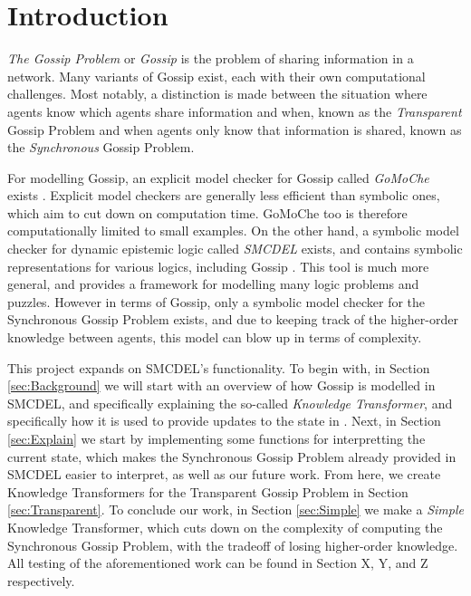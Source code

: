 \section{Introduction}

\textit{The Gossip Problem} or \textit{Gossip} is the problem of sharing information in a network. Many variants of Gossip exist, each with their own computational challenges. Most notably, a distinction is made between the situation where agents know which agents share information and when, known as the \textit{Transparent} Gossip Problem and when agents only know that information is shared, known as the \textit{Synchronous} Gossip Problem.

For modelling Gossip, an explicit model checker for Gossip called \textit{GoMoChe} exists \cite{gattinger2023gomoche}. Explicit model checkers are generally less efficient than symbolic ones, which aim to cut down on computation time. GoMoChe too is therefore computationally limited to small examples. On the other hand, a symbolic model checker for dynamic epistemic logic called \textit{SMCDEL} exists, and contains symbolic representations for various logics, including Gossip \cite{GattingerThesis2018}. This tool is much more general, and provides a framework for modelling many logic problems and puzzles. However in terms of Gossip, only a symbolic model checker for the Synchronous Gossip Problem exists, and due to keeping track of the higher-order knowledge between agents, this model can blow up in terms of complexity.

This project expands on SMCDEL's functionality. To begin with, in Section \ref{sec:Background} we will start with an overview of how Gossip is modelled in SMCDEL, and specifically explaining the so-called \textit{Knowledge Transformer}, and specifically how it is used to provide updates to the state in \cite{GattingerThesis2018}. Next, in Section \ref{sec:Explain} we start by implementing some functions for interpretting the current state, which makes the Synchronous Gossip Problem already provided in SMCDEL easier to interpret, as well as our future work. From here, we create Knowledge Transformers for the Transparent Gossip Problem in Section \ref{sec:Transparent}. To conclude our work, in Section \ref{sec:Simple} we make a \textit{Simple} Knowledge Transformer, which cuts down on the complexity of computing the Synchronous Gossip Problem, with the tradeoff of losing higher-order knowledge. All testing of the aforementioned work can be found in Section X, Y, and Z respectively. 


